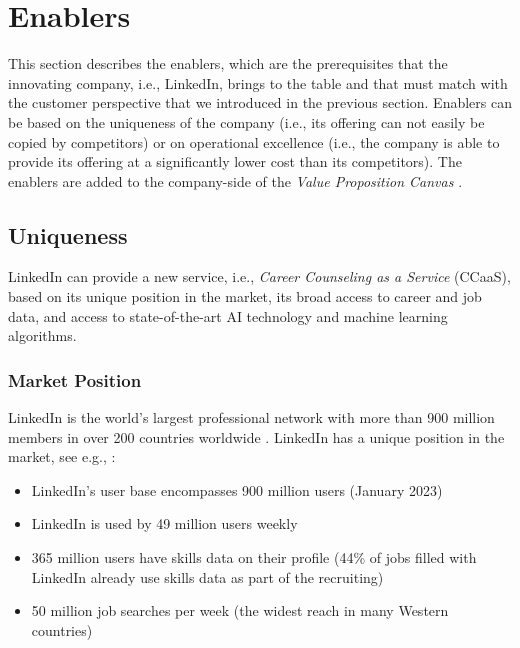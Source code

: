 \section{Enablers}
\label{sec:enablers}

This section describes the enablers, which are the prerequisites that the innovating company, i.e., LinkedIn, brings
to the table and that must match with the customer perspective that we introduced in the previous section. Enablers
can be based on the uniqueness of the company (i.e., its offering can not easily be copied by competitors) or on
operational excellence (i.e., the company is able to provide its offering at a significantly lower cost than its
competitors). The enablers are added to the company-side of the \emph{Value Proposition Canvas}
\citep{osterwalderValuePropositionDesign2014}.

\subsection{Uniqueness}
\label{subsec:uniqueness}

LinkedIn can provide a new service, i.e., \textit{Career Counseling as a Service} (CCaaS), based on its
unique position in the market, its broad access to career and job data, and access to state-of-the-art 
AI technology and machine learning algorithms.

\subsubsection{Market Position}

LinkedIn is the world's largest professional network with more than 900 million members in over 200 countries
worldwide \citep{linkedinLinkedInPressromUs2023}. LinkedIn has a unique position in the market, see e.g.,
\cite{kaserAIpoweredCareerCounseling2023,99firmsLinkedInStatistics20232023}: 

\begin{itemize}
    \item LinkedIn's user base encompasses 900 million users (January 2023)
    \item LinkedIn is used by 49 million users weekly
    \item 365 million users have skills data on their profile (44\% of jobs filled with
        LinkedIn already use skills data as part of the recruiting)
    \item 50 million job searches per week (the widest reach in many Western countries)
\end{itemize}

